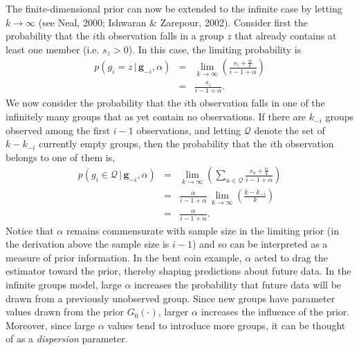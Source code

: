 \documentclass[authoryear]{elsarticle}
\newcommand{\condon}{\,|\,}
\newcommand{\vctr}[1]{\bm{#1}}
\begin{document}
The finite-dimensional prior can now be extended to the infinite case by letting
$k\rightarrow \infty$ (see Neal, 2000; Ishwaran \& Zarepour, 2002).
Consider first the probability that the $i$th observation
falls in a group $z$ that already contains at least one member (i.e. $s_z>0$). In
this case, the limiting probability is
\begin{eqnarray}
        p(g_i=z \condon \vctr{g}_{-i}, \alpha) &=& \lim_{k \rightarrow \infty}
        \left( \frac{s_{z} + \frac{\alpha}{k}}{i-1+\alpha} \right) \nonumber \\
        &=& \frac{s_{z}}{i-1+\alpha}. \label{crpexpand1}
\end{eqnarray}
We now consider the probability that the $i$th observation falls in one of the
infinitely many groups that as yet contain no observations. If there are $k_{-i}$
groups observed among the first $i-1$ observations, and letting $\mathcal{Q}$
denote the  set of $k-k_{-i}$ currently empty groups, then the probability that
the $i$th observation belongs to one of them is,
\begin{eqnarray}
        p(g_i \in \mathcal{Q}  \condon \vctr{g}_{-i}, \alpha)
        &=& \lim_{k \rightarrow \infty} \left(\sum_{u \in \mathcal{Q}} \frac{s_{u}
        + \frac{\alpha}{k}}{i-1+\alpha} \right) \nonumber \\
        &=& \frac{ \alpha}{i-1+\alpha} \, \lim_{k \rightarrow \infty}
        \left(\frac{k-k_{-i}}{k} \right) \nonumber \\
        &=& \frac{\alpha}{i-1+\alpha}. \label{crpexpand2}
\end{eqnarray}
Notice that $\alpha$ remains commensurate with sample size in the limiting
prior (in the derivation above the sample size is $i-1$) and so can be
interpreted as a measure of prior information. In the bent coin example,
$\alpha$ acted to drag the estimator toward the prior, thereby shaping
predictions about future data. In the infinite groups model, large
$\alpha$ increases the probability that future data will be drawn from a
previously unobserved group. Since new groups have parameter values drawn
from the prior $G_0(\cdot)$, larger $\alpha$ increases the influence of
the prior. Moreover, since large $\alpha$ values tend to introduce more
groups, it can be thought of as a \emph{dispersion} parameter.
\end{document}
